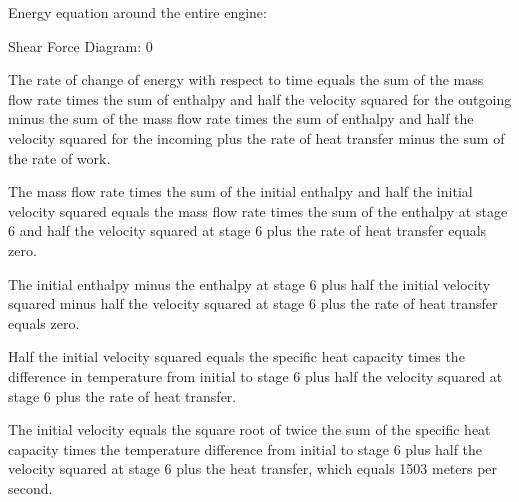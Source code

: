 Energy equation around the entire engine:

Shear Force Diagram: 0

The rate of change of energy with respect to time equals the sum of the mass flow rate times the sum of enthalpy and half the velocity squared for the outgoing minus the sum of the mass flow rate times the sum of enthalpy and half the velocity squared for the incoming plus the rate of heat transfer minus the sum of the rate of work.

The mass flow rate times the sum of the initial enthalpy and half the initial velocity squared equals the mass flow rate times the sum of the enthalpy at stage 6 and half the velocity squared at stage 6 plus the rate of heat transfer equals zero.

The initial enthalpy minus the enthalpy at stage 6 plus half the initial velocity squared minus half the velocity squared at stage 6 plus the rate of heat transfer equals zero.

Half the initial velocity squared equals the specific heat capacity times the difference in temperature from initial to stage 6 plus half the velocity squared at stage 6 plus the rate of heat transfer.

The initial velocity equals the square root of twice the sum of the specific heat capacity times the temperature difference from initial to stage 6 plus half the velocity squared at stage 6 plus the heat transfer, which equals 1503 meters per second.
